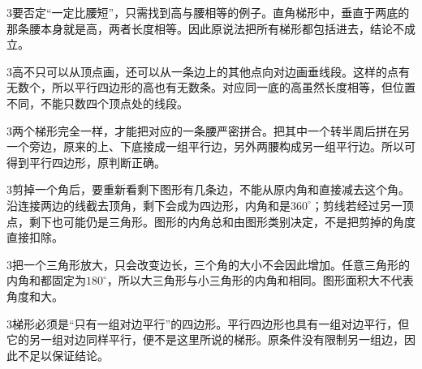 \documentclass[multi=snippet,border={5bp 20bp 5bp 5bp}]{standalone}
\newenvironment{snippet}[3]{\begin{minipage}{#1bp}\color{answerred}\fontsize{#2}{#3}\selectfont\raggedright}{\end{minipage}}
\begin{document}
\begin{snippet}{505}{11.5}{14}\begin{multicols}{3}\raggedcolumns 要否定“一定比腰短”，只需找到高与腰相等的例子。直角梯形中，垂直于两底的那条腰本身就是高，两者长度相等。因此原说法把所有梯形都包括进去，结论不成立。\end{multicols}\end{snippet}
\begin{snippet}{505}{11.5}{14}\begin{multicols}{3}\raggedcolumns 高不只可以从顶点画，还可以从一条边上的其他点向对边画垂线段。这样的点有无数个，所以平行四边形的高也有无数条。对应同一底的高虽然长度相等，但位置不同，不能只数四个顶点处的线段。\end{multicols}\end{snippet}
\begin{snippet}{505}{11.5}{14}\begin{multicols}{3}\raggedcolumns 两个梯形完全一样，才能把对应的一条腰严密拼合。把其中一个转半周后拼在另一个旁边，原来的上、下底接成一组平行边，另外两腰构成另一组平行边。所以可得到平行四边形，原判断正确。\end{multicols}\end{snippet}
\begin{snippet}{505}{11.5}{14}\begin{multicols}{3}\raggedcolumns 剪掉一个角后，要重新看剩下图形有几条边，不能从原内角和直接减去这个角。沿连接两边的线截去顶角，剩下会成为四边形，内角和是\(360^\circ\)\allowbreak ；剪线若经过另一顶点，剩下也可能仍是三角形。图形的内角总和由图形类别决定，不是把剪掉的角度直接扣除。\end{multicols}\end{snippet}
\begin{snippet}{505}{11.5}{14}\begin{multicols}{3}\raggedcolumns 把一个三角形放大，只会改变边长，三个角的大小不会因此增加。任意三角形的内角和都固定为\(180^\circ\)\allowbreak ，所以大三角形与小三角形的内角和相同。图形面积大不代表角度和大。\end{multicols}\end{snippet}
\begin{snippet}{505}{11.5}{14}\begin{multicols}{3}\raggedcolumns 梯形必须是“只有一组对边平行”的四边形。平行四边形也具有一组对边平行，但它的另一组对边同样平行，便不是这里所说的梯形。原条件没有限制另一组边，因此不足以保证结论。\end{multicols}\end{snippet}
\end{document}
